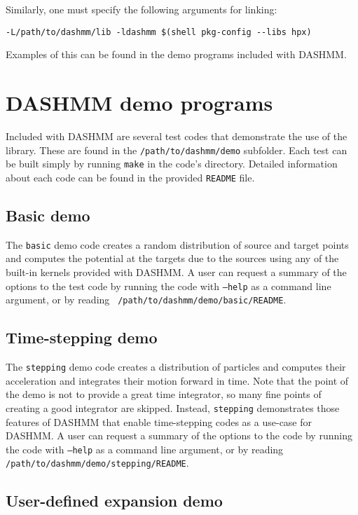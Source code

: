 \documentclass[11pt]{book}
\begin{document}
Similarly, one must specify the following arguments for linking: 

\begin{verbatim}
-L/path/to/dashmm/lib -ldashmm $(shell pkg-config --libs hpx)
\end{verbatim}

Examples of this can be found in the demo programs included with
DASHMM. 

\section{DASHMM demo programs} 

Included with DASHMM are several test codes that demonstrate the use
of the library. These are found in the {\tt /path/to/dashmm/demo}
subfolder. Each test can be built simply by running {\tt make} in the
code's directory. Detailed information about each code can be found in
the provided {\tt README} file. 

\subsection{Basic demo} 
The {\tt basic} demo code creates a random distribution of source and
target points and computes the potential at the targets due to the
sources using any of the built-in kernels provided with DASHMM. A user
can request a summary of the options to the test code by running the
code with {\tt --help} as a command line argument, or by reading {\tt
  /path/to/dashmm/demo/basic/README}. 

\subsection{Time-stepping demo} 
The {\tt stepping} demo code creates a distribution of particles and
computes their acceleration and integrates their motion forward in
time. Note that the point of the demo is not to provide a great time
integrator, so many fine points of creating a good integrator are
skipped. Instead, {\tt stepping} demonstrates those features of DASHMM
that enable time-stepping codes as a use-case for DASHMM. A user can
request a summary of the options to the code by running the code with
{\tt --help} as a command line argument, or by reading {\tt
  /path/to/dashmm/demo/stepping/README}. 

\subsection{User-defined expansion demo} 
\end{document}
